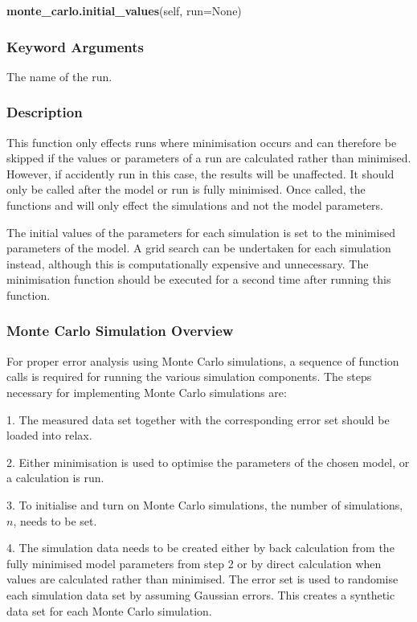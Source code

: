 \textsf{\textbf{monte\_carlo.initial\_values}(self, run=None)}


\subsubsection{Keyword Arguments}

  The name of the run.

\subsubsection{Description}

This function only effects runs where minimisation occurs and can therefore be skipped if
the values or parameters of a run are calculated rather than minimised.  However, if
accidently run in this case, the results will be unaffected.  It should only be called after
the model or run is fully minimised.  Once called, the functions 
 and
 will only effect the simulations and not the model parameters.

The initial values of the parameters for each simulation is set to the minimised parameters
of the model.  A grid search can be undertaken for each simulation instead, although this
is computationally expensive and unnecessary.  The minimisation function should be executed
for a second time after running this function.



\subsubsection{Monte Carlo Simulation Overview}

For proper error analysis using Monte Carlo simulations, a sequence of function calls is
required for running the various simulation components.  The steps necessary for
implementing Monte Carlo simulations are:

1.  The measured data set together with the corresponding error set should be loaded into
relax.

2.  Either minimisation is used to optimise the parameters of the chosen model, or a
calculation is run.

3.  To initialise and turn on Monte Carlo simulations, the number of simulations, $n$, needs
to be set.

4.  The simulation data needs to be created either by back calculation from the fully
minimised model parameters from step 2 or by direct calculation when values are calculated
rather than minimised.  The error set is used to randomise each simulation data set by
assuming Gaussian errors.  This creates a synthetic data set for each Monte Carlo
simulation.

